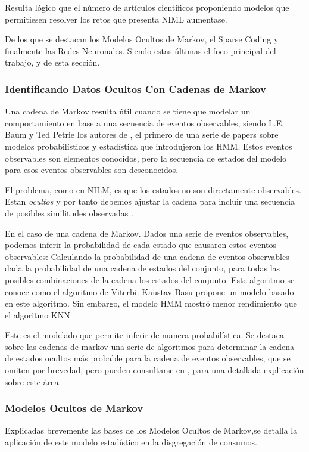 Resulta lógico que el número de artículos científicos proponiendo modelos que permitiesen resolver los retos que presenta NIML aumentase.


De los que se destacan los Modelos Ocultos de Markov, el Sparse Coding y finalmente las Redes Neuronales. Siendo estas últimas el foco principal del trabajo, y de esta sección. 



\subsubsection{Identificando Datos Ocultos Con Cadenas de Markov}
Una cadena de Markov resulta útil cuando se tiene que modelar un comportamiento en base a una secuencia de eventos observables, siendo L.E. Baum y Ted Petrie los autores de \autocite{introductorHMM}, el primero de una serie de papers sobre modelos probabilísticos y estadística que introdujeron los HMM.
Estos eventos observables son elementos conocidos, pero la secuencia de estados del modelo para esos eventos observables son desconocidos. 

El problema, como en NILM, es que los estados no son directamente observables. Estan \textit{ocultos} y por tanto debemos ajustar la cadena para incluir una secuencia de posibles similitudes observadas \autocite{markovStandford}. 

En el caso de una cadena de Markov. Dados una serie de eventos observables, podemos inferir la probabilidad de cada estado que causaron estos eventos observables: Calculando la probabilidad de una cadena de eventos observables dada la probabilidad de una cadena de estados del conjunto, para todas las posibles combinaciones de la cadena los estados del conjunto. 
Este algoritmo se conoce como el algoritmo de Viterbi. Kaustav Basu propone un modelo basado en este algoritmo. Sin embargo, el modelo HMM mostró menor rendimiento que el algoritmo KNN \autocite{Kaustav2015}.

Este es el modelado que permite inferir de manera probabilística.
Se destaca sobre las cadenas de markov una serie de algoritmos para determinar la cadena de estados ocultos más probable para la cadena de eventos observables, que se omiten por brevedad, pero pueden consultarse en \autocite{markovStandford}, para una detallada explicación sobre este área.

\subsubsection{Modelos Ocultos de Markov}
Explicadas brevemente las bases de los Modelos Ocultos de Markov,se detalla la aplicación de este modelo estadístico en la disgregación de consumos. 

